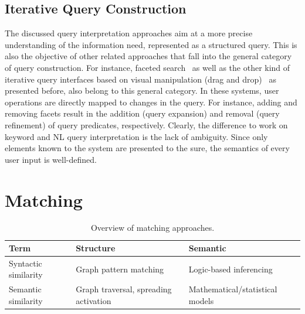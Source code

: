 

\subsection{Iterative Query Construction}

The discussed query interpretation approaches 
aim at a more precise understanding of the information need, represented as a structured query. This is also the objective of other related approaches that fall into the general category of query construction. For instance, faceted search~\cite{DBLP:conf/dexa/WagnerLT11,DBLP:conf/esws/HeimEZ10,DBLP:conf/semweb/FerreH11} as well as the other kind of iterative query interfaces based on visual manipulation (drag and drop)~\cite{DBLP:journals/ws/Harth10} as presented before, also belong to this general category. In these systems, user operations are directly mapped to changes in the query. For instance, adding and removing facets result in the addition (query expansion) and removal (query refinement) of query predicates, respectively. Clearly, the difference to work on keyword and NL query interpretation is the lack of ambiguity. Since only elements known to the system are presented to the sure, the semantics of every user input is well-defined.
	
\section{Matching}\label{sec:matching}
\begin{table}[htbp]
  \centering
  \caption{Overview of matching approaches.}
    \begin{tabular}{|p{2.2cm}|p{2.7cm}|p{2.5cm}|}
    \hline
    \textbf{Term} & \textbf{Structure} & \textbf{Semantic} \bigstrut\\
    \hline
    \hline
    Syntactic similarity & Graph pattern matching  & Logic-based inferencing \bigstrut\\
    \hline
    Semantic similarity & Graph traversal, spreading activation & Mathematical/statistical models\bigstrut\\
    \hline
    \end{tabular}%
  \label{tab:matching}%
\end{table}%

